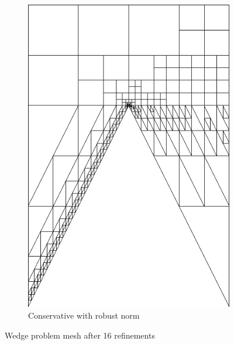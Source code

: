 \documentclass[letterpaper]{article}
\begin{document}
\begin{figure}
\begin{subfigure}[t]{0.4\textwidth}
\includegraphics[width=\textwidth]{figs/Wedge/robust16c_mesh.png}
\caption{Conservative with robust norm}
\label{fig:wedgeRobust16c_mesh}
\end{subfigure}
\caption{Wedge problem mesh after 16 refinements}
\label{fig:wedge_mesh}
\end{figure}
\end{document}
